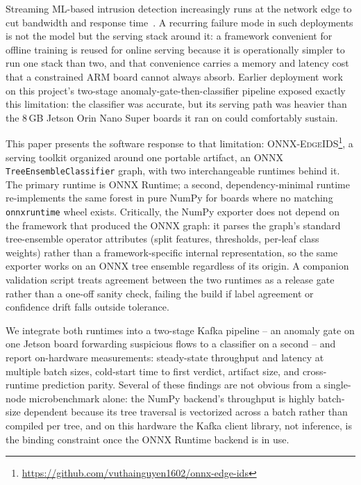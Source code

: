 \documentclass[runningheads]{llncs}
\begin{document}
Streaming ML-based intrusion detection increasingly runs at the network edge to cut bandwidth and response time~\cite{shi2016edge,hamdan2020edge}. A recurring failure mode in such deployments is not the model but the serving stack around it: a framework convenient for offline training is reused for online serving because it is operationally simpler to run one stack than two, and that convenience carries a memory and latency cost that a constrained ARM board cannot always absorb. Earlier deployment work on this project's two-stage anomaly-gate-then-classifier pipeline exposed exactly this limitation: the classifier was accurate, but its serving path was heavier than the 8\,GB Jetson Orin Nano Super boards it ran on could comfortably sustain.

This paper presents the software response to that limitation: \textsc{ONNX-EdgeIDS}\footnote{\url{https://github.com/vuthainguyen1602/onnx-edge-ids}}, a serving toolkit organized around one portable artifact, an ONNX \texttt{TreeEnsembleClassifier} graph, with two interchangeable runtimes behind it. The primary runtime is ONNX Runtime; a second, dependency-minimal runtime re-implements the same forest in pure NumPy for boards where no matching \texttt{onnxruntime} wheel exists. Critically, the NumPy exporter does not depend on the framework that produced the ONNX graph: it parses the graph's standard tree-ensemble operator attributes (split features, thresholds, per-leaf class weights) rather than a framework-specific internal representation, so the same exporter works on an ONNX tree ensemble regardless of its origin. A companion validation script treats agreement between the two runtimes as a release gate rather than a one-off sanity check, failing the build if label agreement or confidence drift falls outside tolerance.

We integrate both runtimes into a two-stage Kafka pipeline -- an anomaly gate on one Jetson board forwarding suspicious flows to a classifier on a second -- and report on-hardware measurements: steady-state throughput and latency at multiple batch sizes, cold-start time to first verdict, artifact size, and cross-runtime prediction parity. Several of these findings are not obvious from a single-node microbenchmark alone: the NumPy backend's throughput is highly batch-size dependent because its tree traversal is vectorized across a batch rather than compiled per tree, and on this hardware the Kafka client library, not inference, is the binding constraint once the ONNX Runtime backend is in use.
\end{document}
